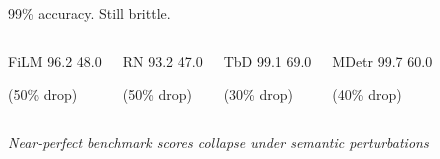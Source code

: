 \begin{frame}{99\% accuracy. Still brittle.}
  \begin{columns}[t]
    \begin{block}{FiLM}
      \centering
      \Large 96.2 \textrightarrow{} 48.0
      \normalsize
      \vspace{0.5em}

      (50\% drop)
    \end{block}

    \begin{block}{RN}
      \centering
      \Large 93.2 \textrightarrow{} 47.0
      \normalsize
      \vspace{0.5em}

      (50\% drop)
    \end{block}

    \begin{block}{TbD}
      \centering
      \Large 99.1 \textrightarrow{} 69.0
      \normalsize
      \vspace{0.5em}

      (30\% drop)
    \end{block}

    \begin{block}{MDetr}
      \centering
      \Large 99.7 \textrightarrow{} 60.0
      \normalsize
      \vspace{0.5em}

      (40\% drop)
    \end{block}
  \end{columns}

  \vspace{1em}
  \centering
  \textit{Near-perfect benchmark scores collapse under semantic perturbations}

\end{frame}

